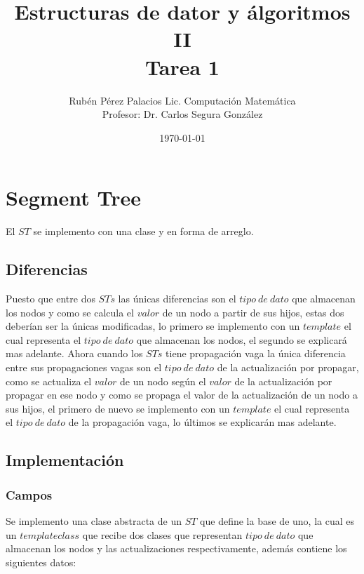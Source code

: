 \documentclass[letterpaper]{article}
\title{Estructuras de dator y álgoritmos II \\ Tarea 1}
\author{Rubén Pérez Palacios Lic. Computación Matemática\\Profesor: Dr. Carlos Segura González}
\date{\today}
\theoremstyle{definition}
\theoremstyle{lemathm}
\theoremstyle{lemathm}
\theoremstyle{lemathm}
\theoremstyle{lemademthm}
\newcommand{\1}{\mathbbm{1}}
\begin{document}
	\maketitle

	\section{Segment Tree}
	
	El $ST$ se implemento con una clase y en forma de arreglo. 

	\subsection*{Diferencias}
	
	Puesto que entre dos $STs$ las únicas diferencias son el $tipo\ de\ dato$ que almacenan los nodos y como se calcula el $valor$ de un nodo a partir de sus hijos, estas dos deberían ser la únicas modificadas, lo primero se implemento con un $template$ el cual representa el $tipo\ de\ dato$ que almacenan los nodos, el segundo se explicará mas adelante. Ahora cuando los $STs$ tiene propagación vaga la única diferencia entre sus propagaciones vagas son el $tipo\ de\ dato$ de la actualización por propagar, como se actualiza el $valor$ de un nodo según el $valor$ de la actualización por propagar en ese nodo y como se propaga el valor de la actualización de un nodo a sus hijos, el primero de nuevo se implemento con un $template$ el cual representa el $tipo\ de\ dato$ de la propagación vaga, lo últimos se explicarán mas adelante.

	\subsection*{Implementación}

	\subsubsection*{Campos}
	
	Se implemento una clase abstracta de un $ST$ que define la base de uno, la cual es un $template class$ que recibe dos clases que representan $tipo\ de\ dato$ que almacenan los nodos y las actualizaciones respectivamente, además contiene los siguientes datos:
	
\end{document}
